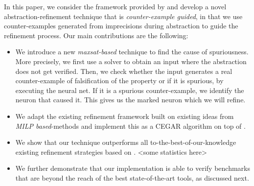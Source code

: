 In this paper, we consider the framework provided by \deeppoly{} and develop a novel abstraction-refinement technique that is {\em counter-example guided}, in that we use counter-examples generated from imprecisions during abstraction to guide the refinement process. Our main contributions are the following:
\begin{itemize}
\item We introduce a new {\em maxsat-based} technique to find the cause of spuriousness. More precisely, we first use a \milp{} solver to obtain an input where the abstraction does not get verified. Then, we check whether the input generates a real counter-example of falsification of the property or if it is spurious, by executing the neural net. If it is a spurious counter-example, we identify the neuron that caused it.  This gives us the marked neuron which we will refine.
\item We adapt the existing refinement framework built on existing ideas from {\em MILP based}-methods and implement this as a CEGAR algorithm on top of \deeppoly{}.
\item We show that our technique outperforms all to-the-best-of-our-knowledge existing refinement strategies based on \deeppoly{}. <some statistics  here>
\item We further demonstrate that our implementation is able to verify benchmarks that are beyond the reach of the best state-of-the-art tools, as discussed next.
\end{itemize}




